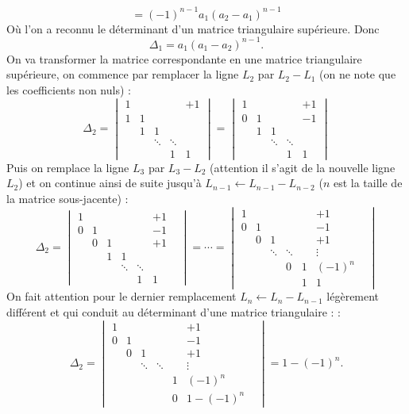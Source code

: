 {{$$= (-1)^{n-1}a_1(a_2-a_1)^{n-1}
$$
Où l'on a reconnu le déterminant d'un matrice triangulaire supérieure.
Donc 
$$\Delta_1 = a_1(a_1-a_2)^{n-1}.$$
On va transformer la matrice correspondante en une matrice triangulaire supérieure,
on commence par remplacer la ligne $L_2$ par $L_2-L_1$ (on ne note que les coefficients non nuls) : 
$$\Delta_2 =   \begin{vmatrix}
  1 &      &    &   &+1 \\
  1 &1      && &  \\
   &1      &1  & &\\
   & &\ddots &\ddots & \\
  &  &       &1      &1
\end{vmatrix}=
 \begin{vmatrix}
  1 &      &    &   &+1 \\
  0 &1      && &  -1\\
   &1      &1  & &\\
   & &\ddots &\ddots & \\
  &  &       &1      &1
\end{vmatrix}
$$
Puis on remplace la ligne $L_3$ par $L_3-L_2$ (attention il s'agit de la nouvelle ligne $L_2$) et on 
continue ainsi de suite jusqu'à $L_{n-1} \leftarrow L_{n-1}-L_{n-2}$ ($n$ est la taille de la matrice sous-jacente) :
$$\Delta_2 =   \begin{vmatrix}
  1 &      &    &   &&+1 \\
  0 &1      && &  &-1\\
    & 0      &1  & & &+1\\
    & & 1      &1  & && \\
   & &&\ddots &\ddots & \\
  &  &       &&1      &1                 
               \end{vmatrix}
= \cdots = 
\begin{vmatrix}
  1 &      &    &   &&+1 \\
  0 &1      && &  &-1\\
    & 0      &1  & & &+1\\
    & & \ddots      &\ddots  & &\vdots& \\
   & &&0 &1 & (-1)^{n} \\
  &  &       &&1      &1                 
               \end{vmatrix}
$$
On fait attention pour le dernier remplacement $L_n \leftarrow L_n-L_{n-1}$ légèrement différent et qui conduit au déterminant d'une matrice triangulaire : :
$$\Delta_2 = \begin{vmatrix}
  1 &      &    &   &&+1 \\
  0 &1      && &  &-1\\
    & 0      &1  & & &+1\\
    & & \ddots      &\ddots  & &\vdots& \\
   & && &1 & (-1)^{n}\\
  &  &       &&0      &1 - (-1)^{n}                 
               \end{vmatrix}
= 1 - (-1)^{n}.
$$

}}
